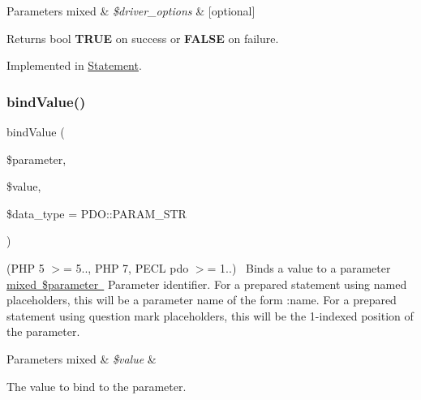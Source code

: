 \begin{DoxyParams}[1]{Parameters}
mixed & {\em \$driver\+\_\+options} & \mbox{[}optional\mbox{]} \\
\hline
\end{DoxyParams}


\begin{DoxyReturn}{Returns}
bool {\bfseries T\+R\+UE} on success or {\bfseries F\+A\+L\+SE} on failure. 
\end{DoxyReturn}


Implemented in \mbox{\hyperlink{class_pes_1_1_database_1_1_statement_1_1_statement_a5b8b69a18923922832bcd98438c28908}{Statement}}.

\mbox{\label{interface_pes_1_1_database_1_1_statement_1_1_p_d_o_statement_interface_ab9f2884830bd9b2063f3422be69015dd}} 
\subsubsection{\texorpdfstring{bind\+Value()}{bindValue()}}
{\footnotesize\ttfamily bind\+Value (\begin{DoxyParamCaption}\item[{}]{\$parameter,  }\item[{}]{\$value,  }\item[{}]{\$data\+\_\+type = {\ttfamily PDO\+:\+:PARAM\+\_\+STR} }\end{DoxyParamCaption})}

(P\+HP 5 $>$= 5.., P\+HP 7, P\+E\+CL pdo $>$= 1..)~\newline
 Binds a value to a parameter \mbox{\hyperlink{}{mixed \$parameter }} Parameter identifier. For a prepared statement using named placeholders, this will be a parameter name of the form \+:name. For a prepared statement using question mark placeholders, this will be the 1-\/indexed position of the parameter. 


\begin{DoxyParams}[1]{Parameters}
mixed & {\em \$value} & \\
\hline
\end{DoxyParams}
The value to bind to the parameter. 


